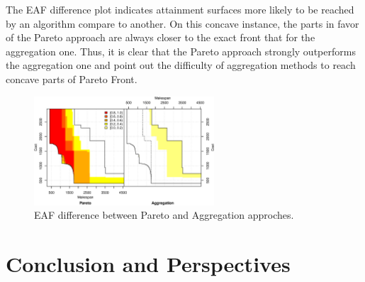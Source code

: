 \documentclass{llncs}
\begin{document}
The EAF difference plot indicates attainment surfaces more likely to be reached by an algorithm compare to another. On this concave instance, the parts in favor of the Pareto approach are always closer to the exact front that for the aggregation one. Thus, it is clear that the Pareto approach strongly outperforms the aggregation one and point out the difficulty of aggregation methods to reach concave parts of Pareto Front.

\begin{figure}[h!]
  \centering
      
      \includegraphics[width=0.6\textwidth]{medium_eaf_diff}
 \caption{\label{medium_diff} EAF difference between Pareto and Aggregation approches.}
\end{figure}

\section{Conclusion and Perspectives}
\label{sec:conclusion}

%
%


%
\end{document}
